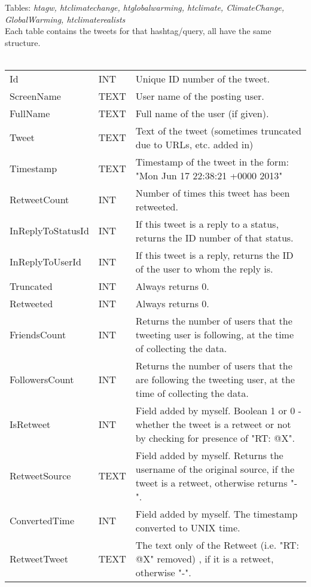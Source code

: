\documentclass[paper=a4, fontsize=11pt]{scrartcl}
\numberwithin{equation}{section}		%
\numberwithin{figure}{section}			%
\numberwithin{table}{section}				%
\begin{document}
Tables: \emph{htagw, htclimatechange, htglobalwarming, htclimate, ClimateChange, GlobalWarming, htclimaterealists}\\
Each table contains the tweets for that hashtag/query, all have the same structure.\\
\\
\begin{tabular}{l | l | p{13cm}} 
Id & INT & Unique ID number of the tweet. \\
ScreenName & TEXT & User name of the posting user. \\
FullName & TEXT & Full name of the user (if given). \\
Tweet & TEXT & Text of the tweet (sometimes truncated due to URLs, etc. added in) \\
Timestamp & TEXT & Timestamp of the tweet in the form:  "Mon Jun 17 22:38:21 +0000 2013" \\
RetweetCount & INT & Number of times this tweet has been retweeted.\\
InReplyToStatusId & INT & If this tweet is a reply to a status, returns the ID number of that status. \\
InReplyToUserId & INT & If this tweet is a reply, returns the ID of the user to whom the reply is.\\
Truncated & INT & Always returns 0. \\
Retweeted & INT & Always returns 0. \\
FriendsCount & INT & Returns the number of users that the tweeting user is following, at the time of collecting the data.\\
FollowersCount & INT & Returns the number of users that the are following the tweeting user, at the time of collecting the data.\ \\
IsRetweet & INT & Field added by myself. Boolean 1 or 0 - whether the tweet is a retweet or not by checking for presence of "RT: @X".\\
RetweetSource & TEXT & Field added by myself. Returns the username of the original source, if the tweet is a retweet, otherwise returns "-". \\
ConvertedTime & INT & Field added by myself. The timestamp converted to UNIX time. \\
RetweetTweet & TEXT & The text only of the Retweet (i.e. "RT: @X" removed) , if it is a retweet, otherwise "-".\\
\end{tabular}\\
\\
\end{document}
